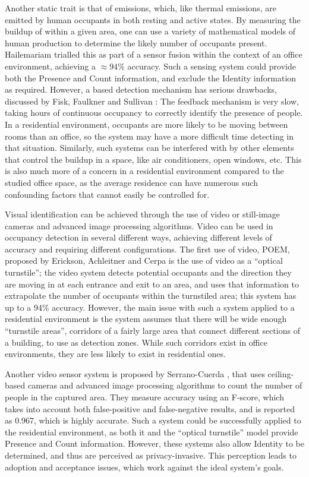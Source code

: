 \documentclass[../thesis/thesis.tex]{subfiles}
\begin{document}
Another static trait is that of \cdi emissions, which, like thermal emissions, are emitted by human occupants in both resting and active states. By measuring the buildup of \cdi within a given area, one can use a variety of mathematical models of human \cdi production to determine the likely number of occupants present. Hailemariam \etal \cite{hailemariam2011real} trialled this as part of a sensor fusion within the context of an office environment, achieving a $\approx94\%$ accuracy. Such a sensing system could provide both the Presence and Count information, and exclude the Identity information as required. However, a \cdi based detection mechanism has serious drawbacks, discussed by Fisk, Faulkner and Sullivan \cite{fisk2006accuracy}: The \cdi feedback mechanism is very slow, taking hours of continuous occupancy to correctly identify the presence of people. In a residential environment, occupants are more likely to be moving between rooms than an office, so the system may have a more difficult time detecting in that situation. Similarly, such systems can be interfered with by other elements that control the \cdi buildup in a space, like air conditioners, open windows, etc. This is also much more of a concern in a residential environment compared to the studied office space, as the average residence can have numerous such confounding factors that cannot easily be controlled for.

Visual identification can be achieved through the use of video or still-image cameras and advanced image processing algorithms. Video can be used in occupancy detection in several different ways, achieving different levels of accuracy and requiring different configurations. The first use of video, POEM, proposed by Erickson, Achleitner and Cerpa \cite{erickson2013poem} is the use of video as a ``optical turnstile''; the video system detects potential occupants and the direction they are moving in at each entrance and exit to an area, and uses that information to extrapolate the number of occupants within the turnstiled area; this system has up to a 94\% accuracy. However, the main issue with such a system applied to a residential environment is the system assumes that there will be wide enough ``turnstile areas'', corridors of a fairly large area that connect different sections of a building, to use as detection zones. While such corridors exist in office environments, they are less likely to exist in residential ones.

Another video sensor system is proposed by Serrano-Cuerda \etal \cite{serrano2013efficient}, that uses ceiling-based cameras and advanced image processing algorithms to count the number of people in the captured area. They measure accuracy using an F-score, which takes into account both false-positive and false-negative results, and is reported as 0.967, which is highly accurate. Such a system could be successfully applied to the residential environment, as both it and the ``optical turnstile'' model provide Presence and Count information. However, these systems also allow Identity to be determined, and thus are perceived as privacy-invasive. This perception leads to adoption and acceptance issues, which work against the ideal system's goals.
\end{document}
